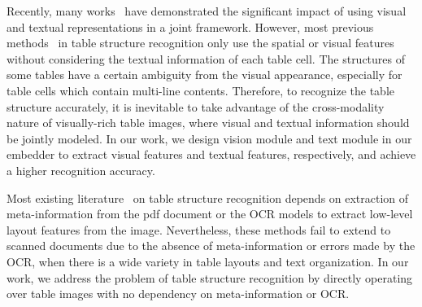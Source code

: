 \documentclass[review]{elsarticle}
\begin{document}
Recently, many works~\cite{VQA-M4C, ImageCaption-DVSA, DSSE} have demonstrated the significant impact of using visual and textual representations in a joint framework. However, most previous methods~\cite{DeepDeSRT, TabStructNet, GraphTSR} in table structure recognition only use the spatial or visual features without considering the textual information of each table cell. The structures of some tables have a certain ambiguity from the visual appearance, especially for table cells which contain multi-line contents. Therefore, to recognize the table structure accurately, it is inevitable to take advantage of the cross-modality nature of visually-rich table images, where visual and textual information should be jointly modeled. In our work, we design vision module and text module in our embedder to extract visual features and textual features, respectively, and achieve a higher recognition accuracy.

Most existing literature~\cite{GraphTSR, ReS2TIM, DGCNN} on table structure recognition depends on extraction of meta-information from the pdf document or the OCR models to extract low-level layout features from the image. Nevertheless, these methods fail to extend to scanned documents due to the absence of meta-information or errors made by the OCR, when there is a wide variety in table layouts and text organization. In our work, we address the problem of table structure recognition by directly operating over table images with no dependency on meta-information or OCR.
\end{document}
